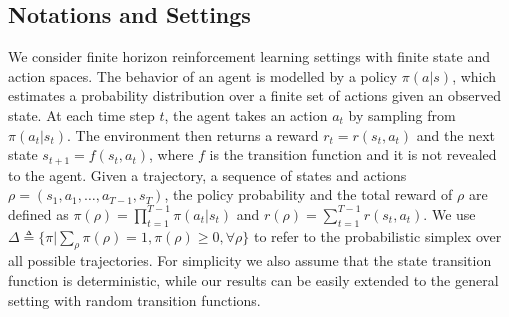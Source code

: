 \subsection{Notations and Settings}
\label{sec:notations_and_settings}

We consider finite horizon reinforcement learning settings with finite state and action spaces. The behavior of an agent is modelled by a policy $\pi(a|s)$, which estimates a probability distribution over a finite set of actions given an observed state. At each time step $t$, the agent takes an action $a_t$ by sampling from $\pi(a_t | s_t)$. The environment then returns a reward $r_t = r(s_t, a_t)$ and the next state $s_{t+1} = f(s_t, a_t)$, where $f$ is the transition function and it is not revealed to the agent. Given a trajectory, a sequence of states and actions $\rho=(s_1, a_1, \dots, a_{T-1}, s_T)$, the policy probability and the total reward of $\rho$ are defined as $\pi(\rho) = \prod_{t=1}^{T-1} \pi(a_t| s_t)$ and $r(\rho) = \sum_{t=1}^{T-1} r(s_t, a_t)$. We use $\Delta \triangleq \{ \pi | \sum_{\rho}{\pi(\rho)} = 1, \pi(\rho) \ge 0, \forall \rho \}$ to refer to the probabilistic simplex over all possible trajectories. For simplicity we also assume that the state transition function is deterministic, while our results can be easily extended to the general setting with random transition functions.